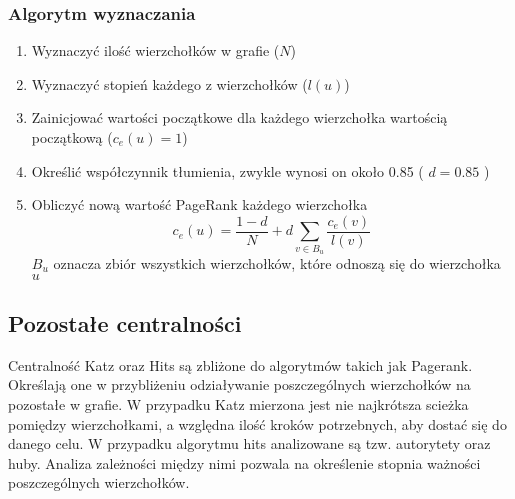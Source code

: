 \subsubsection{Algorytm wyznaczania}
\begin{enumerate}
\item Wyznaczyć ilość wierzchołków w grafie ($N$)
\item Wyznaczyć stopień każdego z wierzchołków ($l(u)$)
\item Zainicjować wartości początkowe dla każdego wierzchołka wartością początkową ($c_e(u) = 1$)
\item Określić współczynnik tłumienia, zwykle wynosi on około 0.85 ( $d = 0.85$ )
\item Obliczyć nową wartość PageRank każdego wierzchołka $$ c_e(u) = \frac{1 - d}{N} + d\sum_{v \in B_u} \frac{c_e(v)}{l(v)}$$ $B_u$ oznacza zbiór wszystkich wierzchołków, które odnoszą się do wierzchołka $u$
\end{enumerate}

\subsection{Pozostałe centralności}
Centralność Katz oraz Hits są zbliżone do algorytmów takich jak Pagerank. Określają one w przybliżeniu odziaływanie poszczególnych wierzchołków na pozostałe w grafie. W przypadku Katz mierzona jest nie najkrótsza scieżka pomiędzy wierzchołkami, a względna ilość kroków potrzebnych, aby dostać się do danego celu. W  przypadku algorytmu hits analizowane są tzw. autorytety oraz huby. Analiza zależności między nimi pozwala na określenie stopnia ważności poszczególnych wierzchołków.